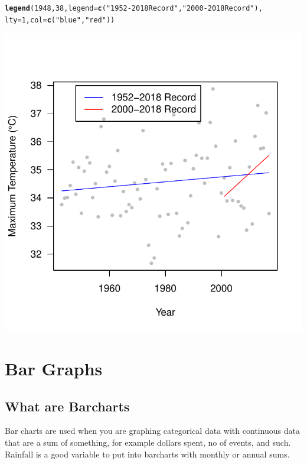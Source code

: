 \documentclass{article}\usepackage[]{graphicx}\usepackage[]{color}
\makeatletter
\def\maxwidth{ %
  \ifdim\Gin@nat@width>\linewidth
    \linewidth
  \else
    \Gin@nat@width
  \fi
}
\newcommand{\hlnum}[1]{\textcolor[rgb]{0.686,0.059,0.569}{#1}}%
\newcommand{\hlstr}[1]{\textcolor[rgb]{0.192,0.494,0.8}{#1}}%
\newcommand{\hlstd}[1]{\textcolor[rgb]{0.345,0.345,0.345}{#1}}%
\newcommand{\hlkwc}[1]{\textcolor[rgb]{0.333,0.667,0.333}{#1}}%
\newcommand{\hlkwd}[1]{\textcolor[rgb]{0.737,0.353,0.396}{\textbf{#1}}}%
\newenvironment{kframe}{%
 \def\at@end@of@kframe{}%
 \ifinner\ifhmode%
  \def\at@end@of@kframe{\end{minipage}}%
  \begin{minipage}{\columnwidth}%
 \fi\fi%
 \def\FrameCommand##1{\hskip\@totalleftmargin \hskip-\fboxsep
 \colorbox{shadecolor}{##1}\hskip-\fboxsep
     \hskip-\linewidth \hskip-\@totalleftmargin \hskip\columnwidth}%
 \MakeFramed {\advance\hsize-\width
   \@totalleftmargin\z@ \linewidth\hsize
   \@setminipage}}%
 {\par\unskip\endMakeFramed%
 \at@end@of@kframe}
\newenvironment{knitrout}{}{} %
\makeatother
\begin{document}
\begin{knitrout}
\begin{kframe}
\begin{alltt}
\hlkwd{legend}\hlstd{(}\hlnum{1948}\hlstd{,} \hlnum{38}\hlstd{,} \hlkwc{legend}\hlstd{=}\hlkwd{c}\hlstd{(}\hlstr{"1952-2018 Record"}\hlstd{,} \hlstr{"2000-2018 Record"}\hlstd{),}
       \hlkwc{lty}\hlstd{=}\hlnum{1}\hlstd{,} \hlkwc{col}\hlstd{=}\hlkwd{c}\hlstd{(}\hlstr{"blue"}\hlstd{,} \hlstr{"red"}\hlstd{))}
\end{alltt}
\end{kframe}
\includegraphics[width=\maxwidth]{figure/plot4-1} 

\end{knitrout}


\clearpage
\section{Bar Graphs}

\subsection{What are Barcharts}

Bar charts are used when you are graphing categorical data with continuous data that are a sum of something, for example dollars spent, no of events, and such. Rainfall is a good variable to put into barcharts with monthly or annual sums. 
\end{document}
